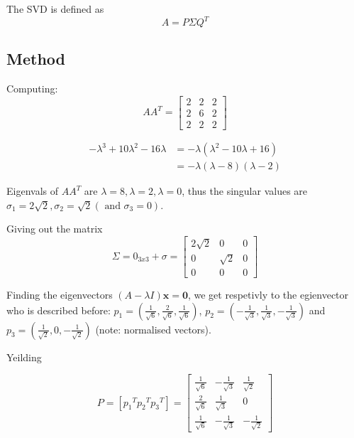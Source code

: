 \documentclass[12pt,a4paper]{article}
\begin{document}
The SVD is defined as
$$
A=P \Sigma Q^{T}
$$

\subsection*{Method}
\label{sec-3-1}
Computing:
$$
A A^{T}=\left[\begin{array}{lll}{2} & {2} & {2} \\ {2} & {6} & {2} \\ {2} & {2} & {2}\end{array}\right]
$$

\begin{equation}
\begin{aligned}
-\lambda^{3}+10 \lambda^{2}-16 \lambda &=-\lambda\left(\lambda^{2}-10 \lambda+16\right) \\
 &=-\lambda(\lambda-8)(\lambda-2) 
\end{aligned}
\end{equation}


Eigenvals of $A A^{T}$ are $\lambda=8, \lambda=2, \lambda=0$, thus the singular values
 are $\sigma_{1}=2 \sqrt{2}, \sigma_{2}=\sqrt{2}\left(\text { and } \sigma_{3}=0\right)$.


Giving out the matrix
$$
\Sigma= 0_{3x3}+\sigma=
\left[\begin{array}{ccc}{2 \sqrt{2}} & {0} & {0} \\ {0} & {\sqrt{2}} & {0} \\ {0} & {0} & {0}\end{array}\right]
$$


Finding the eigenvectors $(A-\lambda I) \mathbf{x}=\mathbf{0}$, we get respetivly to the egienvector
 who is described before: $p_{1}=\left(\frac{1}{\sqrt{6}}, \frac{2}{\sqrt{6}}, \frac{1}{\sqrt{6}}\right)$,
 $p_{2}=\left(-\frac{1}{\sqrt{3}}, \frac{1}{\sqrt{3}},-\frac{1}{\sqrt{3}}\right)$ and 
$p_{3}=\left(\frac{1}{\sqrt{2}}, 0,-\frac{1}{\sqrt{2}}\right)$ (note: normalised vectors).

Yeilding

$$
P= \left[  {p_1}^T {p_2}^T {p_3}^T     \right]
=\left[\begin{array}{ccc}{\frac{1}{\sqrt{6}}} & {-\frac{1}{\sqrt{3}}} & {\frac{1}{\sqrt{2}}} \\ {\frac{2}{\sqrt{6}}} & {\frac{1}{\sqrt{3}}} & {0} \\ {\frac{1}{\sqrt{6}}} & {-\frac{1}{\sqrt{3}}} & {-\frac{1}{\sqrt{2}}}\end{array}\right]
$$
\end{document}

